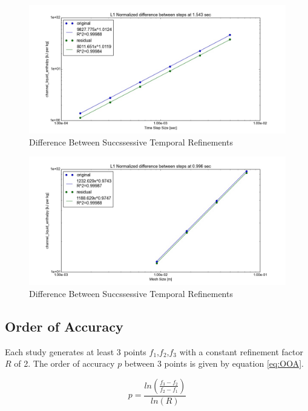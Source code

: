 \documentclass{mc2015}
\begin{document}
\begin{figure}[!h]
	\centering
	\includegraphics[width=1.00\textwidth]{images/Temporal_Study/Difference_h}
	\caption{Difference Between Succssessive Temporal Refinements}
	\label{fig:Temporal:Diff_h}
\end{figure} 

\begin{figure}[!h]
	\centering
	\includegraphics[width=1.00\textwidth]{images/Spatial_Study/Difference_h}
	\caption{Difference Between Succssessive Temporal Refinements}
	\label{fig:Spatial:Diff_h}
\end{figure} 

\subsection{Order of Accuracy}

Each study generates at least 3 points $f_{1}$,$f_{2}$,$f_{3}$ with a constant
refinement factor $R$ of 2. The order of accuracy $p$ between 3 points is given
by equation \eqref{eq:OOA}. 

\begin{equation}
	\label{eq:OOA}
	p= \frac{
	      	ln \left(
	      	\frac{f_{3}-f_{2}}{f_{2}-f_{1}}
	      	\right)
	    }{ln(R)}
\end{equation}
\end{document}
